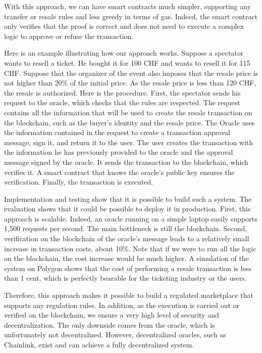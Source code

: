 \documentclass[a4paper,11pt,oneside]{report}
\begin{document}
With this approach, we can have smart contracts much simpler, supporting any transfer or resale rules and less greedy in terms of gas. Indeed, the smart contract only verifies that the proof is correct and does not need to execute a complex logic to approve or refuse the transaction.

Here is an example illustrating how our approach works. Suppose a spectator wants to resell a ticket. He bought it for 100 CHF and wants to resell it for 115 CHF. Suppose that the organizer of the event also imposes that the resale price is not higher than 20\% of the initial price. As the resale price is less than 120 CHF, the resale is authorized. Here is the procedure. First, the spectator sends his request to the oracle, which checks that the rules are respected. The request contains all the information that will be used to create the resale transaction on the blockchain, such as the buyer's identity and the resale price. The Oracle uses the information contained in the request to create a transaction approval message, sign it, and return it to the user. The user creates the transaction with the information he has previously provided to the oracle and the approval message signed by the oracle. It sends the transaction to the blockchain, which verifies it. A smart contract that knows the oracle's public key ensures the verification. Finally, the transaction is executed.

Implementation and testing show that it is possible to build such a system. The evaluation shows that it could be possible to deploy it in production. First, this approach is scalable. Indeed, an oracle running on a simple laptop easily supports 1,500 requests per second. The main bottleneck is still the blockchain. Second, verification on the blockchain of the oracle's message leads to a relatively small increase in transaction costs, about 10\%. Note that if we were to run all the logic on the blockchain, the cost increase would be much higher. A simulation of the system on Polygon shows that the cost of performing a resale transaction is less than 1 cent, which is perfectly bearable for the ticketing industry or the users.

Therefore, this approach makes it possible to build a regulated marketplace that supports any regulation rules. In addition, as the execution is carried out or verified on the blockchain, we ensure a very high level of security and decentralization. The only downside comes from the oracle, which is unfortunately not decentralized. However, decentralized oracles, such as Chainlink, exist and can achieve a fully decentralized system.
\end{document}
